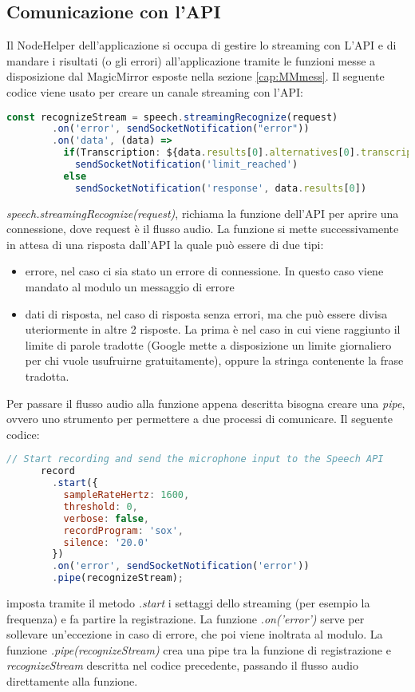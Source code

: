 \subsection{Comunicazione con l'API}\label{cap:api}
Il NodeHelper dell'applicazione si occupa di gestire lo streaming con L'API e
di mandare i risultati (o gli errori) all'applicazione tramite le funzioni messe
a disposizione dal MagicMirror esposte nella sezione \ref{cap:MMmess}.
Il seguente codice viene usato per creare un canale streaming con l'API:
\begin{lstlisting}[language=Javascript, caption={Codice per la comunicazione con l'API}, captionpos=b]
      const recognizeStream = speech.streamingRecognize(request)
        .on('error', sendSocketNotification("error"))
        .on('data', (data) =>
          if(Transcription: ${data.results[0].alternatives[0].transcript}\n)
            sendSocketNotification('limit_reached')
          else
            sendSocketNotification('response', data.results[0])
\end{lstlisting}
\emph{speech.streamingRecognize(request)}, richiama la funzione dell'API per aprire una connessione, dove request \`e
il flusso audio.
La funzione si mette successivamente in attesa di una risposta dall'API la quale pu\`o essere di due tipi:
\begin{itemize}
\item errore, nel caso ci sia stato un errore di connessione. In questo caso viene mandato al modulo un messaggio di errore
\item dati di risposta, nel caso di risposta senza errori, ma che pu\`o essere divisa uteriormente in altre 2 risposte. La prima \`e nel caso in cui
viene raggiunto il limite di parole tradotte (Google mette a disposizione un limite giornaliero per chi vuole usufruirne gratuitamente), oppure
la stringa contenente la frase tradotta.\\[1\baselineskip]
\end{itemize}
Per passare il flusso audio alla funzione appena descritta bisogna creare una \emph{pipe}, ovvero uno strumento
per permettere a due processi di comunicare.
Il seguente codice:
\begin{lstlisting}[language=Javascript]
      // Start recording and send the microphone input to the Speech API
      record
        .start({
          sampleRateHertz: 1600,
          threshold: 0,
          verbose: false,
          recordProgram: 'sox',
          silence: '20.0'
        })
        .on('error', sendSocketNotification('error'))
        .pipe(recognizeStream);
\end{lstlisting}
imposta tramite il metodo \emph{.start} i settaggi dello streaming (per esempio la frequenza) e fa partire la registrazione.
La funzione \emph{.on('error')} serve per sollevare un'eccezione in caso di errore, che poi viene inoltrata al modulo.
La funzione \emph{.pipe(recognizeStream)} crea una pipe tra la funzione di registrazione e \emph{recognizeStream} descritta nel codice precedente,
passando il flusso audio direttamente alla funzione.

